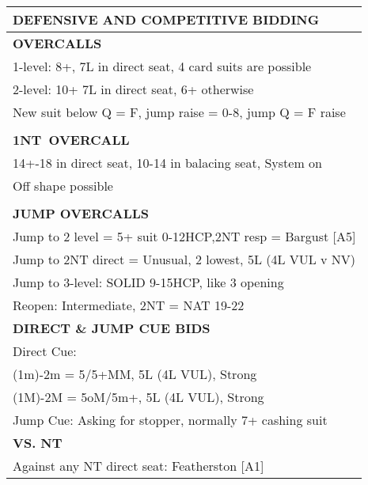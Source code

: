 \documentclass{article}
\newcommand\N{{\footnotesize NT}}
\begin{document}
\noindent
\small{
\begin{minipage}{90mm}
	\begin{tabular}{| p{88mm} |}
		\hline
		\cellcolor{green!25} \textbf{DEFENSIVE AND COMPETITIVE BIDDING} \\ \hline
		\cellcolor{orange!25}\textbf{OVERCALLS} \\ \hline
		1-level: 8+, 7L in direct seat,
		4 card suits are possible\\ \hline
		2-level: 10+  7L in direct seat, 6+ otherwise\\ \hline
		New suit below Q = F, jump raise = 0-8, jump Q = F raise\\ \hline
		\\ \hline
		\cellcolor{orange!25}\textbf{1\N \ OVERCALL} \\ \hline
		14+-18 in direct seat, 10-14 in balacing seat,
		System on\\ \hline
		Off shape possible\\ \hline
		\\ \hline
		\cellcolor{orange!25}\textbf{JUMP OVERCALLS} \\ \hline
		Jump to 2 level = 5+ suit 0-12HCP,2{\N} resp = Bargust [A5]\\ \hline
		Jump to 2{\N} direct = Unusual, 2 lowest, 5L (4L VUL v NV)\\ \hline
		Jump to 3-level: SOLID 9-15HCP, like 3 opening\\ \hline
		Reopen: Intermediate, 2{\N} = NAT 19-22\\ \hline
		\cellcolor{orange!25}\textbf{DIRECT \& JUMP CUE BIDS} \\ \hline
		Direct Cue:\\ \hline
		(1m)-2m = 5/5+MM, 5L (4L VUL), Strong\\ \hline
		(1M)-2M = 5oM/5m+, 5L (4L VUL), Strong\\ \hline
		Jump Cue: Asking for stopper, normally 7+ cashing suit\\ \hline
		\cellcolor{orange!25}\textbf{VS. NT} \\ \hline
		Against any NT direct seat: Featherston [A1]\\ \hline

\end{tabular}
\end{minipage}}
\end{document}
